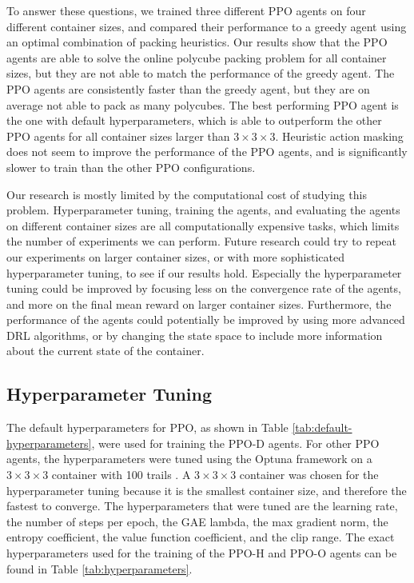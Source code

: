 \documentclass[conference]{IEEEtran}
\begin{document}
To answer these questions, we trained three different PPO agents on four different container sizes, and compared their performance to a greedy agent using an optimal combination of packing heuristics.
Our results show that the PPO agents are able to solve the online polycube packing problem for all container sizes, but they are not able to match the performance of the greedy agent.
The PPO agents are consistently faster than the greedy agent, but they are on average not able to pack as many polycubes.
The best performing PPO agent is the one with default hyperparameters, which is able to outperform the other PPO agents for all container sizes larger than $3 \times 3 \times 3$.
Heuristic action masking does not seem to improve the performance of the PPO agents, and is significantly slower to train than the other PPO configurations.

Our research is mostly limited by the computational cost of studying this problem.
Hyperparameter tuning, training the agents, and evaluating the agents on different container sizes are all computationally expensive tasks, which limits the number of experiments we can perform.
Future research could try to repeat our experiments on larger container sizes, or with more sophisticated hyperparameter tuning, to see if our results hold.
Especially the hyperparameter tuning could be improved by focusing less on the convergence rate of the agents, and more on the final mean reward on larger container sizes.
Furthermore, the performance of the agents could potentially be improved by using more advanced DRL algorithms, or by changing the state space to include more information about the current state of the container.

%
%
\newpage



%
%
\newpage
\appendix
\subsection{Hyperparameter Tuning} \label{app:hyperparameters}
The default hyperparameters for PPO, as shown in Table \ref{tab:default-hyperparameters}, were used for training the PPO-D agents.
For other PPO agents, the hyperparameters were tuned using the Optuna framework on a $3 \times 3 \times 3$ container with 100 trails \cite{optuna}.
A $3 \times 3 \times 3$ container was chosen for the hyperparameter tuning because it is the smallest container size, and therefore the fastest to converge.
The hyperparameters that were tuned are the learning rate, the number of steps per epoch, the GAE lambda, the max gradient norm, the entropy coefficient, the value function coefficient, and the clip range.
The exact hyperparameters used for the training of the PPO-H and PPO-O agents can be found in Table \ref{tab:hyperparameters}.
\end{document}
